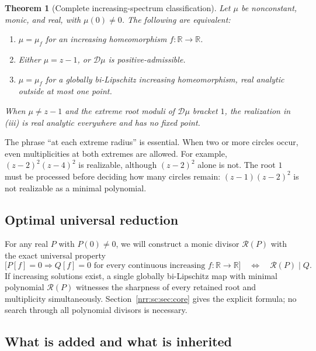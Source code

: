 \documentclass[11pt,letterpaper]{article}
\newtheorem{theorem}{Theorem}[section]
\theoremstyle{definition}
\theoremstyle{remark}
\newcommand{\R}{\mathbb R}
\newcommand{\scD}{\mathcal D}
\newcommand{\core}{\mathcal R}
\begin{document}
\begin{theorem}[Complete increasing-spectrum classification]
\label{nrr:sc:thm:main}
Let $\mu$ be nonconstant, monic, and real, with $\mu(0)\ne0$.
The following are equivalent:
\begin{enumerate}[label=\textnormal{(\roman*)},leftmargin=2.4em]
\item $\mu=\mu_f$ for an increasing homeomorphism $f:\R\to\R$.
\item Either $\mu=z-1$, or $\scD\mu$ is positive-admissible.
\item $\mu=\mu_f$ for a globally bi-Lipschitz increasing homeomorphism,
real analytic outside at most one point.
\end{enumerate}
When $\mu\ne z-1$ and the extreme root moduli of $\scD\mu$ bracket $1$,
the realization in \textnormal{(iii)} is real analytic everywhere and has
no fixed point.
\end{theorem}

The phrase ``at each extreme radius'' is essential. When two or more
circles occur, even multiplicities at both extremes are allowed.
For example, $(z-2)^2(z-4)^2$ is realizable, although $(z-2)^2$ alone is not.
The root $1$ must be processed before deciding how many circles remain:
$(z-1)(z-2)^2$ is not realizable as a minimal polynomial.

\subsection{Optimal universal reduction}

For any real $P$ with $P(0)\ne0$, we will construct a monic divisor
$\core(P)$ with the exact universal property
\begin{equation}
 \bigl[P[f]=0\Longrightarrow Q[f]=0
 \text{ for every continuous increasing }f:\R\to\R\bigr]
 \quad\Longleftrightarrow\quad \core(P)\mid Q.
 \label{nrr:sc:eq:universal}
\end{equation}
If increasing solutions exist, a single globally bi-Lipschitz map with
minimal polynomial $\core(P)$ witnesses the sharpness of every retained
root and multiplicity simultaneously. Section~\ref{nrr:sc:sec:core} gives the
explicit formula; no search through all polynomial divisors is necessary.

\subsection{What is added and what is inherited}
\end{document}
